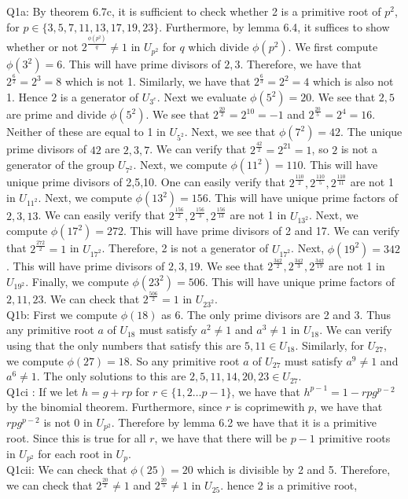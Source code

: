 \documentclass[letterpaper]{article}
\begin{document}
\noindent Q1a: By theorem 6.7c, it is sufficient to check whether 2 is a primitive root of $p^2$, for $p \in \{3,5,7,11,13,17,19,23\}$. Furthermore, by lemma 6.4, it suffices to show whether or not $2^{\frac{\phi(p^2)}{q}} \neq 1$ in $U_{p^2}$ for $q$ which divide $\phi(p^2)$. We first compute $\phi(3^2) = 6$. This will have prime divisors of $2,3$. Therefore, we have that $2^\frac{6}{2}=2^3=8$ which is not 1. Similarly, we have that $2^\frac{6}{3}=2^2=4$ which is also not 1. Hence $2$ is a generator of $U_{3^e}$. Next we evaluate $\phi(5^2)=20$. We see that $2,5$ are prime and divide $\phi(5^2)$. We see that $2^\frac{20}{2}=2^{10}=-1$ and $2^{\frac{20}{5}} = 2^4=16$. Neither of these are equal to 1 in $U_{5^2}$. Next, we see that $\phi(7^2) = 42$.
The unique prime divisors of $42$ are $2,3,7$. We can verify that $2^{\frac{42}{2}}=2^{21}=1$, so $2$ is not a generator of the group $U_{7^2}$. Next, we compute $\phi(11^2) = 110$. This will have unique prime divisors of 2,5,10. One can easily verify that $2^\frac{110}{2},2^\frac{110}{5},2^\frac{110}{11}$ are not 1 in $U_{11^2}$. Next, we compute $\phi(13^2)=156$. This will have unique prime factors of $2,3,13$. We can easily verify that $2^\frac{156}{2},2^\frac{156}{3},2^\frac{156}{13}$ are not 1 in $U_{13^2}$. Next, we compute $\phi(17^2)=272$. This will have prime divisors of 2 and 17. We can verify that $2^\frac{272}{2}=1$ in $U_{17^2}$. Therefore, 2 is not a generator of $U_{17^2}$. Next, $\phi(19^2)=342$. This will have prime divisors of $2,3,19$. We see that $2^\frac{342}{2},2^\frac{342}{3},2^\frac{342}{19}$ are not 1 in $U_{19^2}$. Finally, we compute $\phi(23^2)=506$. This will have unique prime factors of $2,11,23$. We can check that $2^\frac{506}{2}=1$ in $U_{23^2}$. 
\newline \\ Q1b: First we compute $\phi(18)$ as 6. The only prime divisors are 2 and 3. Thus any primitive root $a$ of $U_{18}$ must satisfy $a^2\neq 1$ and $a^3\neq 1$ in $U_{18}$. We can verify using that the only numbers that satisfy this are $5,11\in U_{18}$. Similarly, for $U_{27}$, we compute $\phi(27)=18$. So any primitive root $a$ of $U_{27}$ must satisfy $a^9\neq 1$ and $a^6\neq 1$. The only solutions to this are $2,5,11,14,20,23 \in U_{27}$. 
\newline \\ Q1ci : If we let $h=g+rp$ for $r\in \{1,2\dots p-1\}$, we have that $h^{p-1}=1-rpg^{p-2}$ by the binomial theorem. Furthermore, since $r$ is coprimewith $p$, we have that $rpg^{p-2}$ is not 0 in $U_{p^2}$. Therefore by lemma 6.2 we have that it is a primitive root. Since this is true for all $r$, we have that there will be $p-1$ primitive roots in $U_{p^2}$ for each root in $U_p$.
\newline \\ Q1cii: We can check that $\phi(25)=20$ which is divisible by 2 and 5. Therefore, we can check that $2^\frac{20}{2}\neq 1 $ and $2^\frac{20}{5}\neq 1$ in $U_{25}$. hence 2 is a primitive root,  
\end{document}
